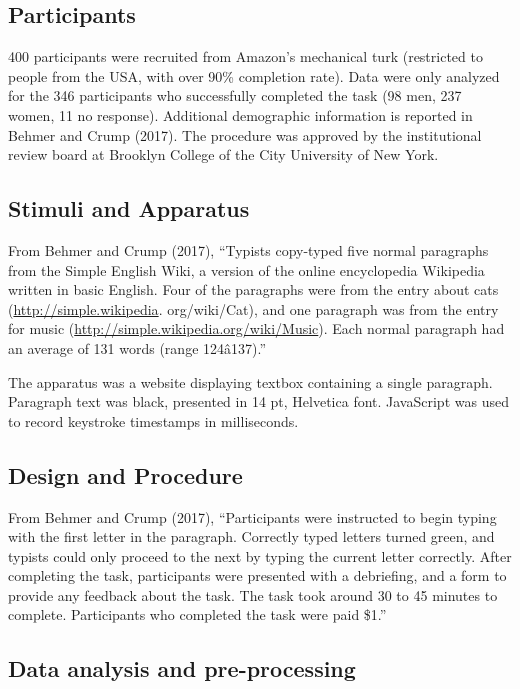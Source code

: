 \documentclass[floatsintext,man]{apa6}
\theoremstyle{definition}
\theoremstyle{definition}
\theoremstyle{definition}
\theoremstyle{remark}
\begin{document}
\subsection{Participants}\label{participants}

400 participants were recruited from Amazon's mechanical turk
(restricted to people from the USA, with over 90\% completion rate).
Data were only analyzed for the 346 participants who successfully
completed the task (98 men, 237 women, 11 no response). Additional
demographic information is reported in Behmer and Crump (2017). The
procedure was approved by the institutional review board at Brooklyn
College of the City University of New York.

\subsection{Stimuli and Apparatus}\label{stimuli-and-apparatus}

From Behmer and Crump (2017), \enquote{Typists copy-typed five normal
paragraphs from the Simple English Wiki, a version of the online
encyclopedia Wikipedia written in basic English. Four of the paragraphs
were from the entry about cats (\url{http://simple.wikipedia}.
org/wiki/Cat), and one paragraph was from the entry for music
(\url{http://simple.wikipedia.org/wiki/Music}). Each normal paragraph
had an average of 131 words (range 124â137).}

The apparatus was a website displaying textbox containing a single
paragraph. Paragraph text was black, presented in 14 pt, Helvetica font.
JavaScript was used to record keystroke timestamps in milliseconds.

\subsection{Design and Procedure}\label{design-and-procedure}

From Behmer and Crump (2017), \enquote{Participants were instructed to
begin typing with the first letter in the paragraph. Correctly typed
letters turned green, and typists could only proceed to the next by
typing the current letter correctly. After completing the task,
participants were presented with a debriefing, and a form to provide any
feedback about the task. The task took around 30 to 45 minutes to
complete. Participants who completed the task were paid \$1.}

\subsection{Data analysis and
pre-processing}\label{data-analysis-and-pre-processing}
\end{document}
